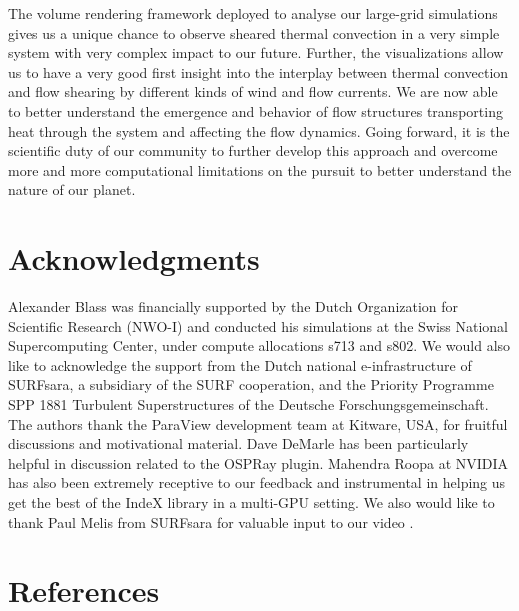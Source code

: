 \documentclass[5p,times]{elsarticle}
\begin{document}
The volume rendering framework deployed to analyse our large-grid simulations gives us a unique chance to observe sheared thermal convection in a very simple system with very complex impact to our future. Further, the visualizations allow us to have a very good first insight into the interplay between thermal convection and flow shearing by different kinds of wind and flow currents. We are now able to better understand the emergence and behavior of flow structures transporting heat through the system and affecting the flow dynamics. Going forward, it is the scientific duty of our community to further develop this approach and overcome more and more computational limitations on the pursuit to better understand the nature of our planet.




\section*{Acknowledgments}

Alexander Blass was financially supported by the Dutch Organization for Scientific Research (NWO-I) and conducted his simulations at the Swiss National Supercomputing Center, under compute allocations s713 and s802. We would also like to acknowledge the support from the Dutch national e-infrastructure of SURFsara, a subsidiary of the SURF cooperation, and the Priority Programme SPP 1881 Turbulent Superstructures of the Deutsche Forschungsgemeinschaft. The authors thank the ParaView development team at Kitware, USA, for fruitful discussions and motivational material. Dave DeMarle has been particularly helpful in discussion related to the OSPRay plugin. Mahendra Roopa ‎at NVIDIA has also been extremely receptive to our feedback and instrumental in helping us get the best of the IndeX library in a multi-GPU setting. We also would like to thank Paul Melis from SURFsara for valuable input to our video \cite{fav18}. 

\section*{References}
 

\end{document}
